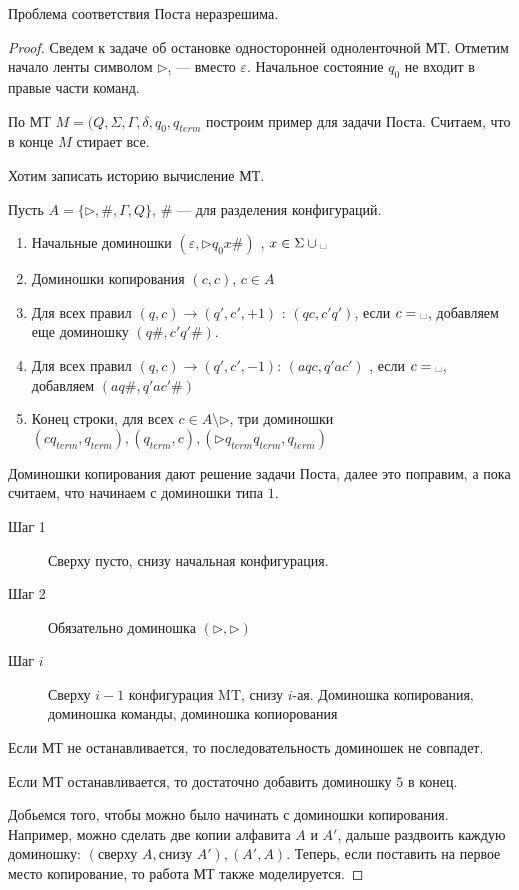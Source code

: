 \begin{thm}[Пост, 1946]
    Проблема соответствия Поста неразрешима.
\end{thm}
\begin{proof}
    Сведем к задаче об остановке односторонней одноленточной МТ. Отметим начало ленты символом $ \triangleright$, \textvisiblespace --- вместо  $ \varepsilon $. Начальное состояние $  q_0$ не входит в правые части команд.

	По МТ $ M = (Q, \Sigma, \Gamma, \delta , q_0, q_{term}$ построим пример для задачи Поста.
	Считаем, что в конце $ M$ стирает все.

	Хотим записать историю вычисление МТ.

	Пусть $ A = \{\triangleright, \#, \Gamma, Q\}$, $ \#$ --- для разделения конфигураций.

	\begin{enumerate}
		\item Начальные доминошки $ ( \varepsilon , \triangleright q_0 x \#)$ , $ x \in \Sigma \cup \text{\textvisiblespace}$
		\item Доминошки копирования $ (c, c)$, $ c \in A $ 
		\item  Для всех правил $ (q, c) \to  (q', c', +1)$ : $(qc, c'q')$, если $ c = \text{\textvisiblespace}$, добавляем еще доминошку $ (q\# , c'q'\#)$.
		\item Для всех правил $ (q, c) \to  (q', c', -1)$: $ (aqc, q'ac')$ , если $ c = \text{\textvisiblespace}$, добавляем $ (aq\#, q'ac'\#)$ 
		\item Конец строки, для всех $ c \in A \setminus \triangleright$, три доминошки
			$ (cq_{term}, q_{term}), (q_{term}, c), (\triangleright q_{term}q_{term}, q_{term})$
	\end{enumerate} 
	\begin{note}
	    Доминошки копирования дают решение задачи Поста, далее это поправим, а пока считаем, что начинаем с доминошки типа $ 1$.
	\end{note}
	\begin{description}
		\item[Шаг 1] Сверху пусто, снизу начальная конфигурация.
		\item[Шаг 2] Обязательно доминошка $ (\triangleright, \triangleright)$ 
		\item[Шаг $ i$] Сверху $ i-1$ конфигурация MT, снизу  $ i$-ая.
			Доминошка копирования, доминошка команды, доминошка копиорования
	\end{description}
	Если МТ не останавливается, то последовательность доминошек не совпадет.

	Если МТ останавливается, то достаточно добавить доминошку  $ 5$ в конец.

	Добьемся того, чтобы можно было начинать с доминошки копирования. Например, можно сделать две копии алфавита $ A$ и $ A'$, дальше раздвоить каждую доминошку: $ (\text{сверху }A, \text{снизу }A'), (A', A)$. Теперь, если поставить на первое место копирование,  то работа МТ также моделируется.
\end{proof}


